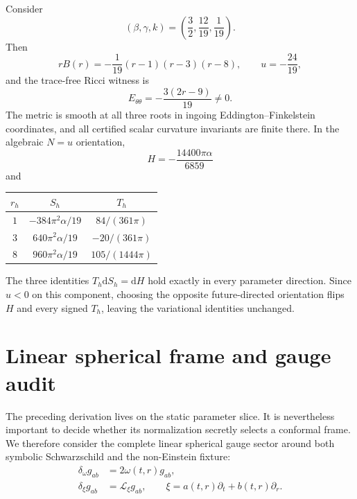 \documentclass[11pt]{article}
\theoremstyle{definition}
\theoremstyle{remark}
\newcommand{\dd}{\mathrm d}
\newcommand{\Lie}{\mathcal L}
\begin{document}
Consider
\begin{equation}\label{eq:fixture}
 (\beta,\gamma,k)=\left(\frac32,\frac{12}{19},\frac1{19}\right).
\end{equation}
Then
\begin{equation}
 rB(r)=-\frac1{19}(r-1)(r-3)(r-8),\qquad
 u=-\frac{24}{19},
\end{equation}
and the trace-free Ricci witness is
\[
 E_{\theta\theta}=-\frac{3(2r-9)}{19}\neq0.
\]
The metric is smooth at all three roots in ingoing
Eddington--Finkelstein coordinates, and all certified scalar curvature
invariants are finite there.  In the algebraic \(N=u\) orientation,
\begin{equation}
 H=-\frac{14400\pi\alpha}{6859}
\end{equation}
and
\begin{center}
\begin{tabular}{c|cc}
\toprule
\(r_h\) & \(S_h\) & \(T_h\)\\
\midrule
\(1\) & \(-384\pi^2\alpha/19\) & \(84/(361\pi)\)\\
\(3\) & \(640\pi^2\alpha/19\) & \(-20/(361\pi)\)\\
\(8\) & \(960\pi^2\alpha/19\) & \(105/(1444\pi)\)\\
\bottomrule
\end{tabular}
\end{center}
The three identities \(T_h\dd S_h=\dd H\) hold exactly in every parameter
direction.  Since \(u<0\) on this component, choosing the opposite
future-directed orientation flips \(H\) and every signed \(T_h\), leaving
the variational identities unchanged.

\section{Linear spherical frame and gauge audit}

The preceding derivation lives on the static parameter slice.  It is
nevertheless important to decide whether its normalization secretly
selects a conformal frame.  We therefore consider the complete linear
spherical gauge sector around both symbolic Schwarzschild and the
non-Einstein fixture:
\begin{align}
 \delta_\omega g_{ab}&=2\omega(t,r)g_{ab},\\
 \delta_\xi g_{ab}&=\Lie_\xi g_{ab},\qquad
 \xi=a(t,r)\partial_t+b(t,r)\partial_r.
\end{align}
\end{document}
